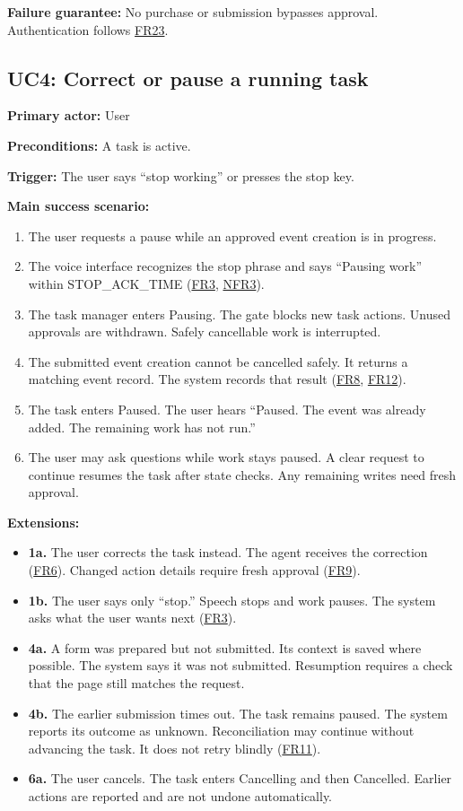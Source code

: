 \documentclass{scrreprt}
\theoremstyle{definition}
\newcommand{\reqlink}[1]{\hyperlink{req:#1}{#1}}
\begin{document}
\textbf{Failure guarantee:} No purchase or submission bypasses approval. Authentication follows \reqlink{FR23}.

\subsection*{UC4: Correct or pause a running task}

\textbf{Primary actor:} User

\textbf{Preconditions:} A task is active.

\textbf{Trigger:} The user says ``stop working'' or presses the stop key.

\textbf{Main success scenario:}
\begin{enumerate}
    \item The user requests a pause while an approved event creation is in progress.
    \item The voice interface recognizes the stop phrase and says ``Pausing work'' within STOP\_ACK\_TIME (\reqlink{FR3}, \reqlink{NFR3}).
    \item The task manager enters Pausing. The gate blocks new task actions. Unused approvals are withdrawn. Safely cancellable work is interrupted.
    \item The submitted event creation cannot be cancelled safely. It returns a matching event record. The system records that result (\reqlink{FR8}, \reqlink{FR12}).
    \item The task enters Paused. The user hears ``Paused. The event was already added. The remaining work has not run.''
    \item The user may ask questions while work stays paused. A clear request to continue resumes the task after state checks. Any remaining writes need fresh approval.
\end{enumerate}

\textbf{Extensions:}
\begin{itemize}
    \item \textbf{1a.} The user corrects the task instead. The agent receives the correction (\reqlink{FR6}). Changed action details require fresh approval (\reqlink{FR9}).
    \item \textbf{1b.} The user says only ``stop.'' Speech stops and work pauses. The system asks what the user wants next (\reqlink{FR3}).
    \item \textbf{4a.} A form was prepared but not submitted. Its context is saved where possible. The system says it was not submitted. Resumption requires a check that the page still matches the request.
    \item \textbf{4b.} The earlier submission times out. The task remains paused. The system reports its outcome as unknown. Reconciliation may continue without advancing the task. It does not retry blindly (\reqlink{FR11}).
    \item \textbf{6a.} The user cancels. The task enters Cancelling and then Cancelled. Earlier actions are reported and are not undone automatically.
\end{itemize}
\end{document}
